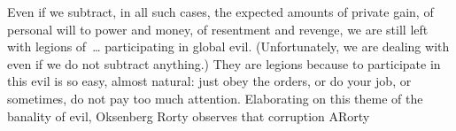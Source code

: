 Even if we subtract, in all such cases, the expected amounts of private gain, of
personal will to power and money, of resentment and revenge, we are still left
with legions of~\ldots {} participating in global evil.
(Unfortunately, we are dealing with  even if we do not
subtract anything.) They are legions because to participate in this evil is so
easy, almost natural: just obey the orders, or do your job, or sometimes, do not
pay too much attention. Elaborating on this theme of the banality of evil,
Oksenberg Rorty observes that 
corruption \citet{can begin with the perception of injury or threat; or with a
  vision of what seems a tantalising good. A society can become so pervasively
  corrupt that its members can typically fail to recognise their
  viciousness.}{ARorty}{}

